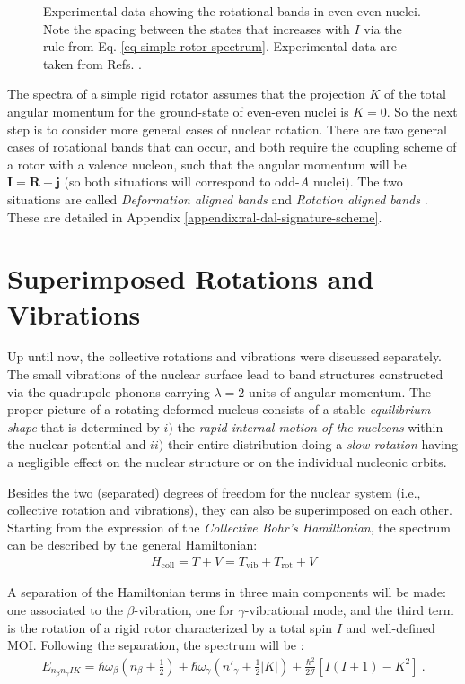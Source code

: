 \begin{figure}
    \caption{Experimental data showing the rotational bands in even-even nuclei. Note the spacing between the states that increases with $I$ via the rule from Eq. \ref{eq-simple-rotor-spectrum}. Experimental data are taken from Refs. \cite{nica2017nuclear,mccutchan2015nuclear}.}
    \label{rotational-bands-even-even}
\end{figure}

The spectra of a simple rigid rotator assumes that the projection $K$ of the total angular momentum for the ground-state of even-even nuclei is $K=0$. So the next step is to consider more general cases of nuclear rotation. There are two general cases of rotational bands that can occur, and both require the coupling scheme of a rotor with a valence nucleon, such that the angular momentum will be $\mathbf{I}=\mathbf{R}+\mathbf{j}$ (so both situations will correspond to odd-$A$ nuclei). The two situations are called \emph{Deformation aligned bands} and \emph{Rotation aligned bands} \cite{uwitonze2015assignment}. These are detailed in Appendix \ref{appendix:ral-dal-signature-scheme}.

\section{Superimposed Rotations and Vibrations}

Up until now, the collective rotations and vibrations were discussed separately. The small vibrations of the nuclear surface lead to band structures constructed via the quadrupole phonons carrying $\lambda=2$ units of angular momentum. The proper picture of a rotating deformed nucleus consists of a stable \emph{equilibrium shape} that is determined by $i)$ the \emph{rapid internal motion of the nucleons} within the nuclear potential and $ii)$ their entire distribution doing a \emph{slow rotation} having a negligible effect on the nuclear structure or on the individual nucleonic orbits.

Besides the two (separated) degrees of freedom for the nuclear system (i.e., collective rotation and vibrations), they can also be superimposed on each other. Starting from the expression of the \emph{Collective Bohr's Hamiltonian}, the spectrum can be described by the general Hamiltonian:
\begin{align}
    H_\text{coll}=T+V=T_\text{vib}+T_\text{rot}+V
\end{align}

A separation of the Hamiltonian terms in three main components will be made: one associated to the $\beta$-vibration, one for $\gamma$-vibrational mode, and the third term is the rotation of a rigid rotor characterized by a total spin $I$ and well-defined MOI. Following the separation, the spectrum will be \cite{ring2004nuclear,li2022model}:
\begin{align}
    E_{n_\beta n_\gamma IK}=\hbar\omega_\beta\left(n_\beta+\frac{1}{2}\right)+\hbar\omega_\gamma\left(n'_\gamma+\frac{1}{2}|K|\right)+\frac{\hbar^2}{2\mathcal{I}}\left[I(I+1)-K^2\right]\ .
    \label{collective-rotation-vibration-energy-spectrum}
\end{align}

